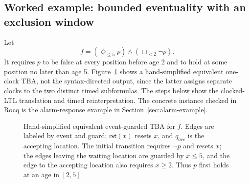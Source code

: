 \subsection{Worked example: bounded eventuality with an exclusion window}
Let
\[
  f=(\Diamond_{\le5}p)\land(\Box_{<2}\neg p).
\]
It requires $p$ to be false at every position before age 2 and to hold at
some position no later than age 5. Figure~\ref{fig:translation-reference-tba} shows a hand-simplified
equivalent one-clock TBA, not the syntax-directed output, since the latter assigns
separate clocks to the two distinct timed subformulas. The steps below show
the clocked-LTL translation and timed reinterpretation. The concrete instance
checked in Rocq is the alarm-response example in
Section~\ref{sec:alarm-example}.

\begin{figure}[t]
\centering

\caption{Hand-simplified equivalent event-guarded TBA for $f$. Edges are labeled by
event and guard; $\mathsf{rst}(x)$ resets $x$, and $q_{\mathit{acc}}$ is the
accepting location. The initial transition requires $\neg p$ and resets $x$;
the edges leaving the waiting location are guarded by $x\le5$, and the edge to
the accepting location also requires $x\ge2$. Thus $p$ first holds at an age
in $[2,5]$}
\label{fig:translation-reference-tba}
\end{figure}

